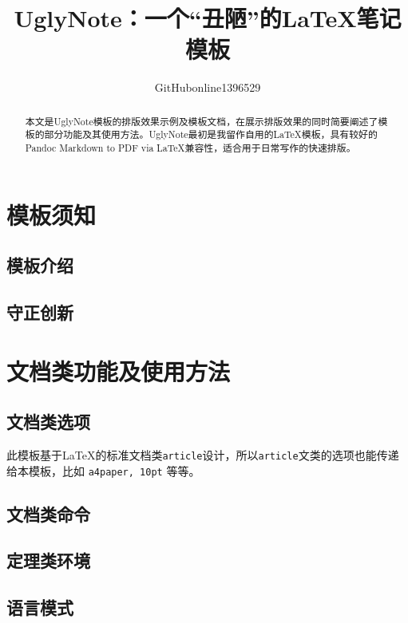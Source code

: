\documentclass[12pt, blue]{uglynote}
\title{\bfseries UglyNote：一个“丑陋”的\LaTeX{}笔记模板}
\author{GitHubonline1396529}
\date{\zhtoday}
\begin{document}
\maketitle
\begin{abstract}
  本文是UglyNote模板的排版效果示例及模板文档，在展示排版效果的同时简要阐述了模板的部分功能及其使用方法。UglyNote最初是我留作自用的\LaTeX 模板，具有较好的Pandoc Markdown to PDF via \LaTeX 兼容性，适合用于日常写作的快速排版。

\end{abstract}

\section{模板须知}
\subsection{模板介绍}


\subsection{守正创新}


\section{文档类功能及使用方法}
\subsection{文档类选项}\label{ssec:classoptions}

此模板基于\LaTeX{}的标准文档类\texttt{article}设计，所以\texttt{article}文类的选项也能传递给本模板，比如 \texttt{a4paper, 10pt} 等等。



\subsection{文档类命令}


\subsection{定理类环境}


\subsection{语言模式}

\end{document}
